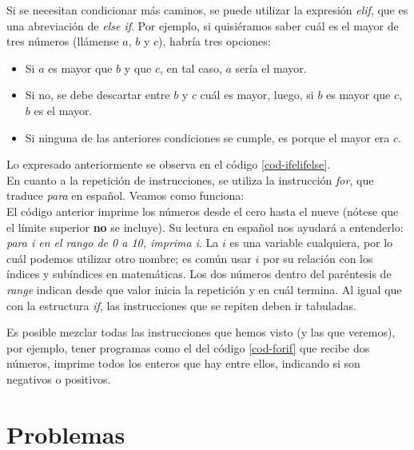 

Si se necesitan condicionar más caminos, se puede utilizar la expresión \emph{elif}, que es una abreviación de \emph{else if}. Por ejemplo, si quisiéramos saber cuál es el mayor de tres números (llámense $a$, $b$ y $c$), habría tres opciones: 
\begin{itemize}
\item Si $a$ es mayor que $b$ y que $c$, en tal caso, $a$ sería el mayor.

\item Si no, se debe descartar entre $b$ y $c$ cuál es mayor, luego, si $b$ es mayor que $c$, $b$ es el mayor.

\item Si ninguna de las anteriores condiciones se cumple, es porque el mayor era $c$. 
\end{itemize}


Lo expresado anteriormente se observa en el código \ref{cod-ifelifelse}.  \\



En cuanto a la repetición de instrucciones, se utiliza la instrucción \emph{for}, que traduce \emph{para} en español. Veamos como funciona: \\



El código anterior imprime los números desde el cero hasta el nueve (nótese que el límite superior \textbf{no} se incluye). Su lectura en español nos ayudará a entenderlo: \emph{para i en el rango de 0 a 10, imprima i}. La $i$ es una variable cualquiera, por lo cuál podemos utilizar otro nombre; es común usar $i$ por su relación con los índices y subíndices en matemáticas. Los dos números dentro del paréntesis de \emph{range} indican desde que valor inicia la repetición y en cuál termina. Al igual que con la estructura \emph{if}, las instrucciones que se repiten deben ir tabuladas.

Es posible mezclar todas las instrucciones que hemos visto (y las que veremos), por ejemplo, tener programas como el del código \ref{cod-forif} que recibe dos números, imprime todos los enteros que hay entre ellos, indicando si son negativos o positivos.






\section{Problemas}



\newpage